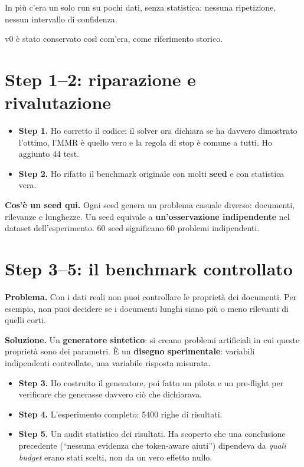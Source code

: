 \documentclass[11pt,a4paper]{article}
\begin{document}
In più c'era un solo run su pochi dati, senza statistica: nessuna ripetizione, nessun intervallo di confidenza.

v0 è stato conservato così com'era, come riferimento storico.

\section{Step 1--2: riparazione e rivalutazione}

\begin{itemize}
  \item \textbf{Step 1.} Ho corretto il codice: il solver ora dichiara se ha davvero dimostrato l'ottimo, l'MMR è quello vero e la regola di stop è comune a tutti. Ho aggiunto 44 test.
  \item \textbf{Step 2.} Ho rifatto il benchmark originale con molti \textbf{seed} e con statistica vera.
\end{itemize}

\begin{nota}
\textbf{Cos'è un seed qui.} Ogni seed genera un problema casuale diverso: documenti, rilevanze e lunghezze. Un seed equivale a \textbf{un'osservazione indipendente} nel dataset dell'esperimento. 60 seed significano 60 problemi indipendenti.
\end{nota}

\section{Step 3--5: il benchmark controllato}

\textbf{Problema.} Con i dati reali non puoi controllare le proprietà dei documenti. Per esempio, non puoi decidere se i documenti lunghi siano più o meno rilevanti di quelli corti.

\textbf{Soluzione.} Un \textbf{generatore sintetico}: si creano problemi artificiali in cui queste proprietà sono dei parametri. È un \textbf{disegno sperimentale}: variabili indipendenti controllate, una variabile risposta misurata.

\begin{itemize}
  \item \textbf{Step 3.} Ho costruito il generatore, poi fatto un pilota e un pre-flight per verificare che generasse davvero ciò che dichiarava.
  \item \textbf{Step 4.} L'esperimento completo: 5400 righe di risultati.
  \item \textbf{Step 5.} Un audit statistico dei risultati. Ha scoperto che una conclusione precedente (``nessuna evidenza che token-aware aiuti'') dipendeva da \emph{quali budget} erano stati scelti, non da un vero effetto nullo.
\end{itemize}
\end{document}

